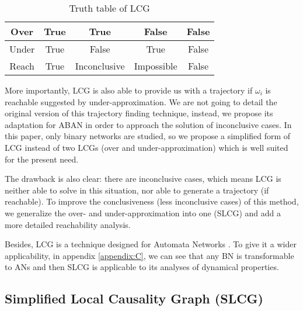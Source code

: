\documentclass[runningheads]{llncs}
\begin{document}
\begin{table}[ht]
\centering
\begin{tabular}{c|c|c|c|c}
Over&True&True&False&False\\
\hline
Under&True&False&True&False\\
\hline
Reach&True&Inconclusive&Impossible&False\\
\end{tabular}
\caption{Truth table of LCG}
\label{tab:1}
\end{table}

More importantly, LCG is also able to provide us with a trajectory if $\omega_i$ is reachable suggested by under-approximation. We are not going to detail the original version of this trajectory finding technique, instead, we propose its adaptation for ABAN in order to approach the solution of inconclusive cases.
In this paper, only binary networks are studied, so we propose a simplified form of LCG instead of two LCGs (over and under-approximation) which is well suited for the present need.

The drawback is also clear: there are inconclusive cases, which means LCG is neither able to solve in this situation, nor able to generate a trajectory (if reachable). To improve the conclusiveness (less inconclusive cases) of this method, we generalize the over- and under-approximation into one (SLCG) and add a more detailed reachability analysis.

Besides, LCG is a technique designed for Automata Networks \cite{folschette2015}. To give it a wider applicability, in appendix \ref{appendix:C}, we can see that any BN is transformable to ANs and then SLCG is applicable to its analyses of dynamical properties.
\subsection{Simplified Local Causality Graph (SLCG)}
\end{document}
